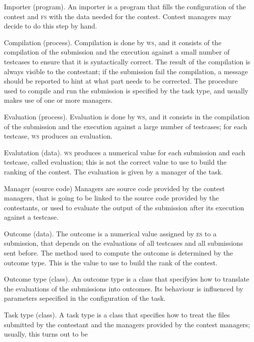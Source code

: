 \documentclass[a4paper,8pt]{amsart}
\newcommand{\FS}{\textsc{fs}}
\newcommand{\ES}{\textsc{es}}
\newcommand{\WS}{\textsc{ws}}
\newenvironment{squishlist}{%
  \begin{list}{\textbullet}%
    { \setlength{\itemsep}{0pt}%
      \setlength{\parsep}{3pt}%
      \setlength{\topsep}{3pt}%
      \setlength{\partopsep}{0pt}%
      \setlength{\leftmargin}{1.5em}%
      \setlength{\labelwidth}{1em}%
      \setlength{\labelsep}{0.5em} }%
}{\end{list}}
\begin{document}
\begin{multicols}{2}
  \begin{squishlist}
  \item[Importer (program).] An importer is a program that fills the
    configuration of the contest and \FS{} with the data needed for
    the contest. Contest managers may decide to do this step by hand.
  \item[Compilation (process).] Compilation is done by \WS{}, and it
    consists of the compilation of the submission and the execution
    against a small number of testcases to ensure that it is
    syntactically correct. The result of the compilation is always
    visible to the contestant; if the submission fail the compilation,
    a message should be reported to hint at what part needs to be
    corrected. The procedure used to compile and run the submission is
    specified by the task type, and usually makes use of one or more
    managers.
  \item[Evaluation (process).] Evaluation is done by \WS{}, and it
    consists in the compilation of the submission and the execution
    against a large number of testcases; for each testcase, \WS{}
    produces an evaluation.
  \item[Evalutation (data).] \WS{} produces a numerical value for each
    submission and each testcase, called evaluation; this is not the
    correct value to use to build the ranking of the contest. The
    evaluation is given by a manager of the task.
  \item[Manager (source code)] Managers are source code provided by
    the contest managers, that is going to be linked to the source
    code provided by the contestants, or used to evaluate the output
    of the submission after its execution against a testcase.
  \item[Outcome (data).] The outcome is a numerical value assigned by
    \ES{} to a submission, that depends on the evaluations of all
    testcases and all submissions sent before. The method used to
    compute the outcome is determined by the outcome type. This is the
    value to use to build the rank of the contest.
  \item[Outcome type (class).] An outcome type is a class that
    specifyies how to translate the evaluations of the submissions
    into outcomes. Its behaviour is influenced by parameters
    sepecified in the configuration of the task.
  \item[Task type (class).] A task type is a class that specifies how
    to treat the files submitted by the contestant and the managers
    provided by the contest managers; usually, this turns out to be

\end{squishlist}
\end{multicols}
\end{document}
